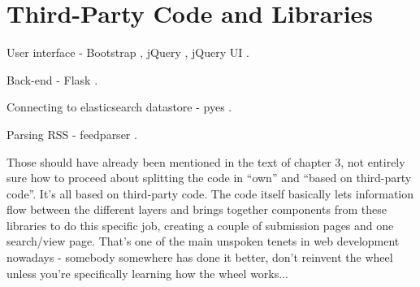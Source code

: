 \chapter{Third-Party Code and Libraries}

User interface - Bootstrap \cite{bootstrap}, jQuery \cite{jquery}, jQuery UI \cite{jquery-ui}.

Back-end - Flask \cite{flask}.

Connecting to elasticsearch datastore - pyes \cite{pyes}.

Parsing RSS - feedparser \cite{feedparser}.

Those should have already been mentioned in the text of chapter 3, not entirely sure how to proceed about splitting the code in ``own'' and ``based on third-party code''. It's all based on third-party code. The code itself basically lets information flow between the different layers and brings together components from these libraries to do this specific job, creating a couple of submission pages and one search/view page. That's one of the main unspoken tenets in web development nowadays - somebody somewhere has done it better, don't reinvent the wheel unless you're specifically learning how the wheel works...